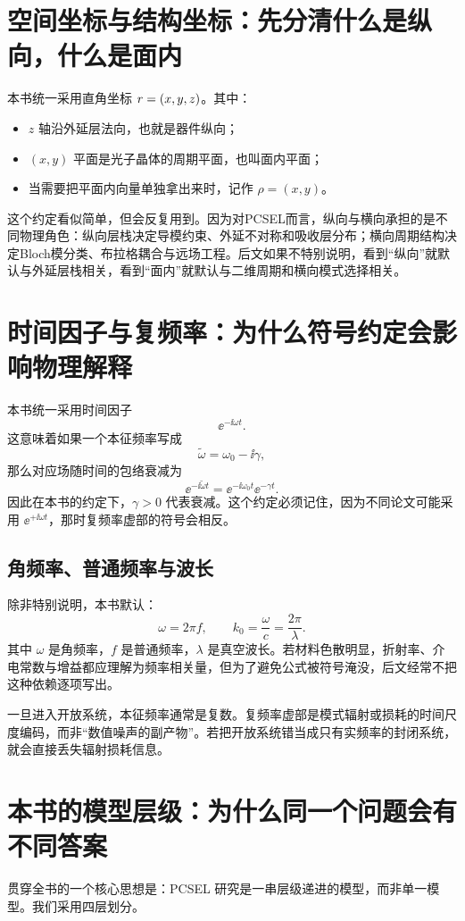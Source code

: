 \section{空间坐标与结构坐标：先分清什么是纵向，什么是面内}
本书统一采用直角坐标 $r=(x,y,z)$。其中：
\begin{itemize}
  \item $z$ 轴沿外延层法向，也就是器件纵向；
  \item $(x,y)$ 平面是光子晶体的周期平面，也叫面内平面；
  \item 当需要把平面内向量单独拿出来时，记作 $\rho=(x,y)$。
\end{itemize}

这个约定看似简单，但会反复用到。因为对PCSEL而言，纵向与横向承担的是不同物理角色：纵向层栈决定导模约束、外延不对称和吸收层分布；横向周期结构决定Bloch模分类、布拉格耦合与远场工程。后文如果不特别说明，看到“纵向”就默认与外延层栈相关，看到“面内”就默认与二维周期和横向模式选择相关。


\section{时间因子与复频率：为什么符号约定会影响物理解释}
本书统一采用时间因子
\begin{equation}
\ee^{-\ii\omega t}.
\label{eq:time_factor}
\end{equation}
这意味着如果一个本征频率写成
\[
\tilde{\omega}=\omega_0-\ii\gamma,
\]
那么对应场随时间的包络衰减为
\[
\ee^{-\ii\tilde{\omega}t}=\ee^{-\ii\omega_0 t}\ee^{-\gamma t}.
\]
因此在本书的约定下，$\gamma>0$ 代表衰减。这个约定必须记住，因为不同论文可能采用 $\ee^{+\ii\omega t}$，那时复频率虚部的符号会相反。

\subsection{角频率、普通频率与波长}
除非特别说明，本书默认：
\[
\omega=2\pi f,\qquad
k_0=\frac{\omega}{c}=\frac{2\pi}{\lambda}.
\]
其中 $\omega$ 是角频率，$f$ 是普通频率，$\lambda$ 是真空波长。若材料色散明显，折射率、介电常数与增益都应理解为频率相关量，但为了避免公式被符号淹没，后文经常不把这种依赖逐项写出。

\begin{RigorousBox}
一旦进入开放系统，本征频率通常是复数。复频率虚部是模式辐射或损耗的时间尺度编码，而非“数值噪声的副产物”。若把开放系统错当成只有实频率的封闭系统，就会直接丢失辐射损耗信息。
\end{RigorousBox}

\section{本书的模型层级：为什么同一个问题会有不同答案}
贯穿全书的一个核心思想是：PCSEL 研究是一串层级递进的模型，而非单一模型。我们采用四层划分。

